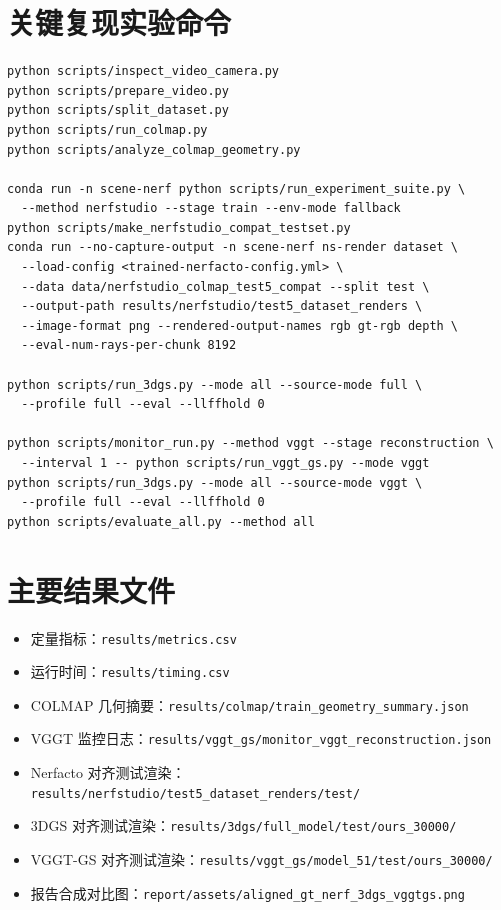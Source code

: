 \documentclass[UTF8,a4paper,11pt]{ctexart}
\begin{document}
\section{关键复现实验命令}

\begin{verbatim}
python scripts/inspect_video_camera.py
python scripts/prepare_video.py
python scripts/split_dataset.py
python scripts/run_colmap.py
python scripts/analyze_colmap_geometry.py

conda run -n scene-nerf python scripts/run_experiment_suite.py \
  --method nerfstudio --stage train --env-mode fallback
python scripts/make_nerfstudio_compat_testset.py
conda run --no-capture-output -n scene-nerf ns-render dataset \
  --load-config <trained-nerfacto-config.yml> \
  --data data/nerfstudio_colmap_test5_compat --split test \
  --output-path results/nerfstudio/test5_dataset_renders \
  --image-format png --rendered-output-names rgb gt-rgb depth \
  --eval-num-rays-per-chunk 8192

python scripts/run_3dgs.py --mode all --source-mode full \
  --profile full --eval --llffhold 0

python scripts/monitor_run.py --method vggt --stage reconstruction \
  --interval 1 -- python scripts/run_vggt_gs.py --mode vggt
python scripts/run_3dgs.py --mode all --source-mode vggt \
  --profile full --eval --llffhold 0
python scripts/evaluate_all.py --method all
\end{verbatim}

\section{主要结果文件}

\begin{itemize}
  \item 定量指标：\texttt{results/metrics.csv}
  \item 运行时间：\texttt{results/timing.csv}
  \item COLMAP 几何摘要：\texttt{results/colmap/train\_geometry\_summary.json}
  \item VGGT 监控日志：\texttt{results/vggt\_gs/monitor\_vggt\_reconstruction.json}
  \item Nerfacto 对齐测试渲染：\texttt{results/nerfstudio/test5\_dataset\_renders/test/}
  \item 3DGS 对齐测试渲染：\texttt{results/3dgs/full\_model/test/ours\_30000/}
  \item VGGT-GS 对齐测试渲染：\texttt{results/vggt\_gs/model\_51/test/ours\_30000/}
  \item 报告合成对比图：\texttt{report/assets/aligned\_gt\_nerf\_3dgs\_vggtgs.png}
\end{itemize}
\end{document}
